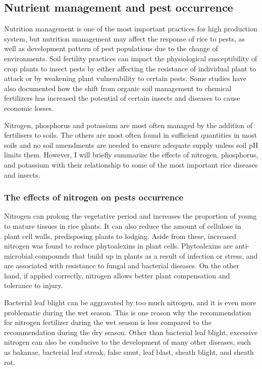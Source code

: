 \documentclass[12pt, oneside]{report}
\begin{document}
\subsection*{Nutrient management and pest occurrence}

Nutrition management is one of the most important practices for high production system, but nutrition management may affect the response of rice to pests, as well as development pattern of pest populations due to the change of environments. Soil fertility practices can impact the physiological susceptibility of crop plants to insect pests by either affecting the resistance of individual plant to attack or by weakening plant vulnerability to certain pests. Some studies have also documented how the shift from organic soil management to chemical fertilizers has increased the potential of certain insects and diseases to cause economic losses.

Nitrogen, phosphorus and potassium are most often managed by the addition of fertilisers to soils. The others are most often found in sufficient quantities in most soils and no soil amendments are needed to ensure adequate supply unless soil pH limits them. However, I will briefly summarize the effects of nitrogen, phosphorus, and potassium with their relationship to some of the most important rice diseases and insects.

\subsubsection{The effects of nitrogen on pests occurrence}

Nitrogen can prolong the vegetative period and increases the proportion of young to mature tissues in rice plants. It can also reduce the amount of cellulose in plant cell walls, predisposing plants to lodging. Aside from these, increased nitrogen was found to reduce phytoalexins in plant cells. Phytoalexins are anti-microbial compounds that build up in plants as a result of infection or stress, and are associated with resistance to fungal and bacterial diseases. On the other hand, if applied correctly, nitrogen allows better plant compensation and tolerance to injury. 

Bacterial leaf blight can be aggravated by too much nitrogen, and it is even more problematic during the wet season. This is one reason why the recommendation for nitrogen fertilizer during the wet season is less compared to the recommendation during the dry season. Other than bacterial leaf blight, excessive nitrogen can also be conducive to the development of many other diseases, such as bakanae, bacterial leaf streak, false smut, leaf blast, sheath blight, and sheath rot.
\end{document}
